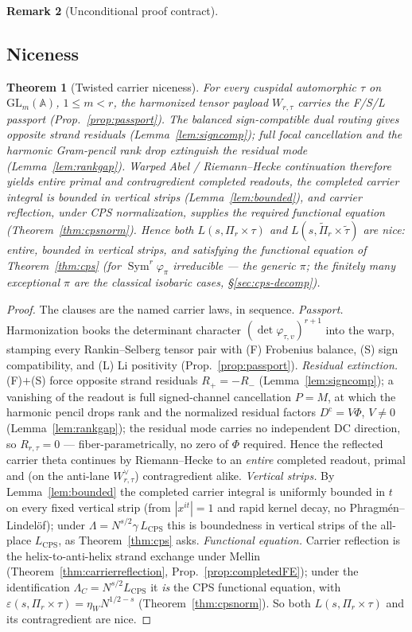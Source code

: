 \documentclass[11pt]{article}
\newtheorem{theorem}{Theorem}
\theoremstyle{definition}
\newtheorem{remark}[theorem]{Remark}
\newcommand{\Sym}{\operatorname{Sym}}
\begin{document}
\begin{remark}[Unconditional proof contract]
\begin{enumerate}
\section{Niceness}\label{sec:cps-nice}
\begin{theorem}[Twisted carrier niceness]\label{thm:cps-nice}
For every cuspidal automorphic $\tau$ on $\mathrm{GL}_m(\mathbb A)$, $1\le m<r$, the harmonized tensor payload
$W_{r,\tau}$ carries the F/S/L passport (Prop.~\ref{prop:passport}). The balanced sign-compatible dual routing
gives opposite strand residuals (Lemma~\ref{lem:signcomp}); full focal cancellation and the harmonic
Gram-pencil rank drop extinguish the residual mode (Lemma~\ref{lem:rankgap}). Warped Abel / Riemann--Hecke
continuation therefore yields entire primal and contragredient completed readouts, the completed carrier
integral is bounded in vertical strips (Lemma~\ref{lem:bounded}), and carrier reflection, under CPS
normalization, supplies the required functional equation (Theorem~\ref{thm:cpsnorm}). Hence both
$L(s,\Pi_r\times\tau)$ and $L(s,\widetilde\Pi_r\times\widetilde\tau)$ are \emph{nice}: entire, bounded in
vertical strips, and satisfying the functional equation of Theorem~\ref{thm:cps} (for $\Sym^r\varphi_\pi$
irreducible --- the generic $\pi$; the finitely many exceptional $\pi$ are the classical isobaric cases,
\S\ref{sec:cps-decomp}).
\end{theorem}
\begin{proof}
The clauses are the named carrier laws, in sequence.
\emph{Passport.} Harmonization books the determinant character $(\det\varphi_{\tau,v})^{r+1}$ into the warp,
stamping every Rankin--Selberg tensor pair with (F) Frobenius balance, (S) sign compatibility, and (L) Li
positivity (Prop.~\ref{prop:passport}).
\emph{Residual extinction.} (F)$+$(S) force opposite strand residuals $R_+=-R_-$ (Lemma~\ref{lem:signcomp}); a
vanishing of the readout is full signed-channel cancellation $P=M$, at which the harmonic pencil drops rank and
the normalized residual factors $D^{\mathrm c}=V\Phi$, $V\neq0$ (Lemma~\ref{lem:rankgap}); the residual mode
carries no independent DC direction, so $R_{r,\tau}=0$ --- fiber-parametrically, no zero of $\Phi$ required.
Hence the reflected carrier theta continues by Riemann--Hecke to an \emph{entire} completed readout, primal and
(on the anti-lane $W_{r,\tau}^\vee$) contragredient alike.
\emph{Vertical strips.} By Lemma~\ref{lem:bounded} the completed carrier integral is uniformly bounded in $t$ on
every fixed vertical strip (from $|x^{it}|=1$ and rapid kernel decay, no Phragm\'en--Lindel\"of); under
$\Lambda=N^{s/2}\gamma\,L_{\mathrm{CPS}}$ this is boundedness in vertical strips of the all-place
$L_{\mathrm{CPS}}$, as Theorem~\ref{thm:cps} asks.
\emph{Functional equation.} Carrier reflection is the helix-to-anti-helix strand exchange under Mellin
(Theorem~\ref{thm:carrierreflection}, Prop.~\ref{prop:completedFE}); under the identification
$\Lambda_C=N^{s/2}L_{\mathrm{CPS}}$ it \emph{is} the CPS functional equation, with
$\varepsilon(s,\Pi_r\times\tau)=\eta_W N^{1/2-s}$ (Theorem~\ref{thm:cpsnorm}). So both $L(s,\Pi_r\times\tau)$
and its contragredient are nice.
\end{proof}


\end{enumerate}
\end{remark}
\end{document}
